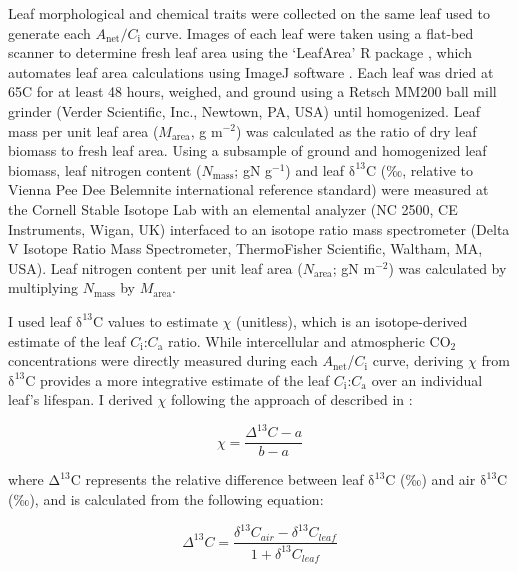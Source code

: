 Leaf morphological and chemical traits were collected on the same leaf used to generate each $A_\mathrm{net}/C_\mathrm{i}$ curve. Images of each leaf were taken using a flat-bed scanner to determine fresh leaf area using the ‘LeafArea’ R package , which automates leaf area calculations using ImageJ software . Each leaf was dried at 65\textdegree{}C for at least 48 hours, weighed, and ground using a Retsch MM200 ball mill grinder (Verder Scientific, Inc., Newtown, PA, USA) until homogenized. Leaf mass per unit leaf area ($M_\mathrm{area}$, g m$^{-2}$) was calculated as the ratio of dry leaf biomass to fresh leaf area. Using a subsample of ground and homogenized leaf biomass, leaf nitrogen content ($N_\mathrm{mass}$; gN g$^{-1}$) and leaf $\mathrm{\delta^{13}C}$ (‰, relative to Vienna Pee Dee Belemnite international reference standard) were measured at the Cornell Stable Isotope Lab with an elemental analyzer (NC 2500, CE Instruments, Wigan, UK) interfaced to an isotope ratio mass spectrometer (Delta V Isotope Ratio Mass Spectrometer, ThermoFisher Scientific, Waltham, MA, USA). Leaf nitrogen content per unit leaf area ($N_\mathrm{area}$; gN m$^{-2}$) was calculated by multiplying $N_\mathrm{mass}$ by $M_\mathrm{area}$.

I used leaf $\mathrm{\delta^{13}}$C values to estimate $\chi$ (unitless), which is an isotope-derived estimate of the leaf $C_\mathrm{i}$:$C_\mathrm{a}$ ratio. While intercellular and atmospheric CO$_2$ concentrations were directly measured during each $A_\mathrm{net}$/$C_\mathrm{i}$ curve, deriving $\chi$ from $\mathrm{\delta^{13}}$C provides a more integrative estimate of the leaf $C_\mathrm{i}$:$C_\mathrm{a}$ over an individual leaf’s lifespan. I derived $\chi$ following the approach of  described in :

\begin{equation} \label{eq_2.1}
    \chi= \frac{\Delta^{13}C-a}{b-a}
\end{equation}

\noindent where $\mathrm{\Delta^{13}}$C represents the relative difference between leaf $\mathrm{\delta^{13}}$C (‰) and air $\mathrm{\delta^{13}}$C (‰), and is calculated from the following equation:

\begin{equation} \label{eq_2.2}
    \Delta^{13}C= \frac{\delta^{13}C_{air}-\delta^{13}C_{leaf}}{1+\delta^{13}C_{leaf}}
\end{equation}
    

